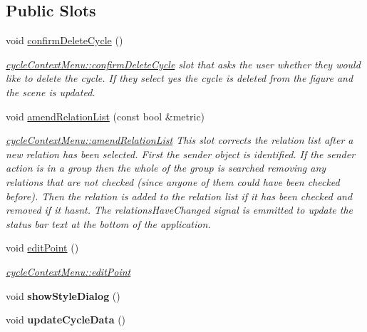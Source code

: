 \subsection*{Public Slots}
\begin{DoxyCompactItemize}
\item 
\mbox{\label{classcycle_context_menu_a844d59a74d643b19fd19eb1de11ea4e9}} 
void \mbox{\hyperlink{classcycle_context_menu_a844d59a74d643b19fd19eb1de11ea4e9}{confirm\+Delete\+Cycle}} ()
\begin{DoxyCompactList}\small\item\em \mbox{\hyperlink{classcycle_context_menu_a844d59a74d643b19fd19eb1de11ea4e9}{cycle\+Context\+Menu\+::confirm\+Delete\+Cycle}} slot that asks the user whether they would like to delete the cycle. If they select yes the cycle is deleted from the figure and the scene is updated. \end{DoxyCompactList}\item 
\mbox{\label{classcycle_context_menu_ad6adc2b3c3ad2650190967f7d4efd088}} 
void \mbox{\hyperlink{classcycle_context_menu_ad6adc2b3c3ad2650190967f7d4efd088}{amend\+Relation\+List}} (const bool \&metric)
\begin{DoxyCompactList}\small\item\em \mbox{\hyperlink{classcycle_context_menu_ad6adc2b3c3ad2650190967f7d4efd088}{cycle\+Context\+Menu\+::amend\+Relation\+List}} This slot corrects the relation list after a new relation has been selected. First the sender object is identified. If the sender action is in a group then the whole of the group is searched removing any relations that are not checked (since anyone of them could have been checked before). Then the relation is added to the relation list if it has been checked and removed if it hasn\textquotesingle{}t. The relations\+Have\+Changed signal is emmitted to update the status bar text at the bottom of the application. \end{DoxyCompactList}\item 
void \mbox{\hyperlink{classcycle_context_menu_ae807f1cddefcdedf9f8c60473bd287df}{edit\+Point}} ()
\begin{DoxyCompactList}\small\item\em \mbox{\hyperlink{classcycle_context_menu_ae807f1cddefcdedf9f8c60473bd287df}{cycle\+Context\+Menu\+::edit\+Point}} \end{DoxyCompactList}\item 
\mbox{\label{classcycle_context_menu_ae985f8d22bb60ae9dc406cb7276ec1a5}} 
void {\bfseries show\+Style\+Dialog} ()
\item 
\mbox{\label{classcycle_context_menu_a7d75eefbcc183770b18c578336d354e1}} 
void {\bfseries update\+Cycle\+Data} ()
\end{DoxyCompactItemize}
